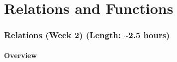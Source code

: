 \documentclass[11pt]{article}
\newcommand\about{\textasciitilde}
\theoremstyle{definition}
\begin{document}
\newpage \part{Relations and Functions} 

\section{Relations (Week 2) (Length: \about 2.5 hours)}\label{s: relations}  %
\subsection{Overview}
\end{document}
